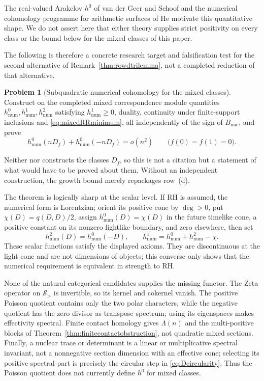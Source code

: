 \documentclass[11pt]{amsart}
\theoremstyle{definition}
\newtheorem{problem}[theorem]{Problem}
\theoremstyle{remark}
\newcommand{\RH}{\mathrm{RH}}
\begin{document}
The real-valued Arakelov $h^0$ of van der Geer and Schoof
\cite{GeerSchoof} and the numerical cohomology programme for arithmetic
surfaces of He \cite{He2025} motivate this quantitative shape.  We do not
assert here that either theory supplies strict positivity on every class or
the bound below for the mixed classes of this paper.

The following is therefore a concrete research target and falsification
test for the second alternative of Remark~\ref{thm:rowdtrilemma}, not a
completed reduction of that alternative.

\begin{problem}[Subquadratic numerical cohomology for the mixed classes]
\label{prob:subquadratic}
Construct on the completed mixed correspondence module quantities
$h^0_{\mathrm{num}},h^1_{\mathrm{num}},h^2_{\mathrm{num}}$ satisfying
$h^1_{\mathrm{num}}\ge0$, duality, continuity under finite-support
inclusions and \eqref{eq:mixedRRminimum}, all independently of the sign of
$B_{\mathrm{nuc}}$, and prove
\[
 h^0_{\mathrm{num}}(nD_f)+h^0_{\mathrm{num}}(-nD_f)=o(n^2)
 \qquad\bigl(\widehat f(0)=\widehat f(1)=0\bigr).
\]
\end{problem}

Neither \cite{GeerSchoof} nor \cite{He2025} constructs the classes $D_f$, so
this is not a citation but a statement of what would have to be proved about
them.  Without an independent construction, the growth bound merely repackages
row~(d).

The theorem is logically sharp at the scalar level.  If $\RH$ is assumed,
the numerical form is Lorentzian; orient its positive cone by $\deg>0$, put
$\chi(D)=q(D,D)/2$, assign $h^0_{\mathrm{num}}(D)=\chi(D)$ in the future
timelike cone, a positive constant on its nonzero lightlike boundary, and
zero elsewhere, then set
\[
 h^2_{\mathrm{num}}(D)=h^0_{\mathrm{num}}(-D),\qquad
 h^1_{\mathrm{num}}=h^0_{\mathrm{num}}+h^2_{\mathrm{num}}-\chi.
\]
These scalar functions satisfy the displayed axioms.  They are discontinuous
at the light cone and are not dimensions of objects; this converse only
shows that the numerical requirement is equivalent in strength to $\RH$.

None of the natural categorical candidates supplies the missing functor.
The Zeta operator on $\mathcal S_>$ is invertible, so its kernel and cokernel
vanish.  The positive Poisson quotient contains only the two polar
characters, while the negative quotient has the zero divisor as transpose
spectrum; using its eigenspaces makes effectivity spectral.  Finite contact
homology gives $\Lambda(n)$ and the multi-positive blocks of
Theorem~\ref{thm:finitecontactobstruction}, not quadratic mixed sections.
Finally, a nuclear trace or determinant is a linear or multiplicative
spectral invariant, not a nonnegative section dimension with an effective
cone; selecting its positive spectral part is precisely the circular step
in \eqref{eq:Dcircularity}.  Thus the Poisson quotient does not currently define
$h^0$ for mixed classes.
\end{document}
